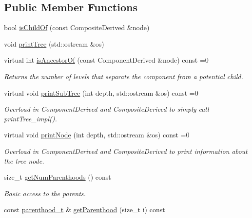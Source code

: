 \subsection*{Public Member Functions}
\begin{DoxyCompactItemize}
\item 
bool \hyperlink{classocra_1_1Component_a77448d773b20fda6d8349d20691a8840}{is\+Child\+Of} (const Composite\+Derived \&node)
\item 
void \hyperlink{classocra_1_1Component_a9bc74f9a471df60ee9b1d49e7f55e04f}{print\+Tree} (std\+::ostream \&os)
\item 
virtual int \hyperlink{classocra_1_1Component_a8a0e052f36c60889562e921751b02a37}{is\+Ancestor\+Of} (const Component\+Derived \&node) const =0
\begin{DoxyCompactList}\small\item\em Returns the number of levels that separate the component from a potential child. \end{DoxyCompactList}\item 
virtual void \hyperlink{classocra_1_1Component_a3687a02c1524694fc616893264ca8199}{print\+Sub\+Tree} (int depth, std\+::ostream \&os) const =0
\begin{DoxyCompactList}\small\item\em Overload in Component\+Derived and Composite\+Derived to simply call print\+Tree\+\_\+impl(). \end{DoxyCompactList}\item 
virtual void \hyperlink{classocra_1_1Component_a61bb6d9557a6ba3d13f9bc083422d1a7}{print\+Node} (int depth, std\+::ostream \&os) const =0
\begin{DoxyCompactList}\small\item\em Overload in Component\+Derived and Composite\+Derived to print information about the tree node. \end{DoxyCompactList}\end{DoxyCompactItemize}
{\bf }\par
\begin{DoxyCompactItemize}
\item 
size\+\_\+t \hyperlink{classocra_1_1Component_abc5066cb5523dd4ee8782ab7f75a26d5}{get\+Num\+Parenthoods} () const
\begin{DoxyCompactList}\small\item\em Basic access to the parents. \end{DoxyCompactList}\item 
const \hyperlink{classocra_1_1Component_a70fb7cda78934a9f017c7e46c1407953}{parenthood\+\_\+t} \& \hyperlink{classocra_1_1Component_a368948e115852fa524f9a8da257aed1f}{get\+Parenthood} (size\+\_\+t i) const
\end{DoxyCompactItemize}


